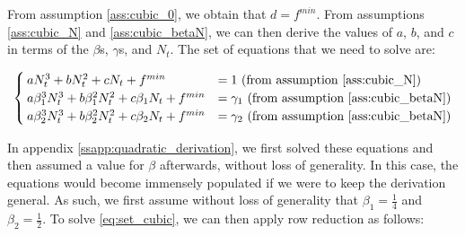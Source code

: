 \documentclass[12pt]{article}
\begin{document}
\begin{appendices}
		From assumption \ref{ass:cubic_0}, we obtain that $d = f^{min}$. From assumptions \ref{ass:cubic_N} and \ref{ass:cubic_betaN}, we can then derive the values of $a$, $b$, and $c$ in terms of the $\beta$s, $\gamma$s, and $N_t$. The set of equations that we need to solve are:
		
		\begin{equation} \label{eq:set_cubic}
		    \begin{cases}
		        aN_t^3 + bN_t^2 + cN_t + f^{min} &= 1 \text{ (from assumption \ref{ass:cubic_N})}\\
		        a\beta_1^3 N_t^3 + b\beta_1^2 N_t^2 + c\beta_1N_t + f^{min} &= \gamma_1 \text{ (from assumption \ref{ass:cubic_betaN})} \\
		        a\beta_2^3 N_t^3 + b\beta_2^2 N_t^2 + c\beta_2 N_t + f^{min} &= \gamma_2 \text{ (from assumption \ref{ass:cubic_betaN})}
		    \end{cases}
		\end{equation}
		
		In appendix \ref{ssapp:quadratic_derivation}, we first solved these equations and then assumed a value for $\beta$ afterwards, without loss of generality. In this case, the equations would become immensely populated if we were to keep the derivation general. As such, we first assume without loss of generality that $\beta_1 = \frac{1}{4}$ and $\beta_2 = \frac{1}{2}$. To solve \eqref{eq:set_cubic}, we can then apply row reduction as follows:
		

\end{appendices}
\end{document}
